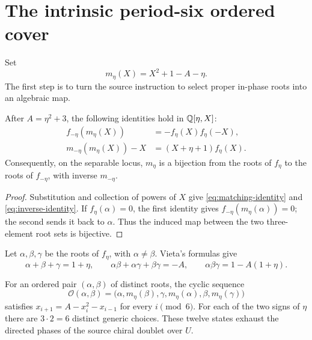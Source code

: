 \section{The intrinsic period-six ordered cover}\label{sec:ordered}

Set
\begin{equation}\label{eq:matching-map}
 m_\eta(X)=X^2+1-A-\eta.
\end{equation}
The first step is to turn the source instruction to select proper in-phase
roots into an algebraic map.

\begin{lemma}\label{lem:matching}
After $A=\eta^2+3$, the following identities hold in $\mathbb Q[\eta,X]$:
\begin{align}
 f_{-\eta}(m_\eta(X))&=-f_\eta(X)f_\eta(-X),
 \label{eq:matching-identity}\\
 m_{-\eta}(m_\eta(X))-X&=(X+\eta+1)f_\eta(X).
 \label{eq:inverse-identity}
\end{align}
Consequently, on the separable locus, $m_\eta$ is a bijection from the roots
of $f_\eta$ to the roots of $f_{-\eta}$, with inverse $m_{-\eta}$.
\end{lemma}

\begin{proof}
Substitution and collection of powers of $X$ give
\eqref{eq:matching-identity} and \eqref{eq:inverse-identity}.  If
$f_\eta(\alpha)=0$, the first identity gives
$f_{-\eta}(m_\eta(\alpha))=0$; the second sends it back to $\alpha$.
Thus the induced map between the two three-element root sets is bijective.
\end{proof}

Let $\alpha,\beta,\gamma$ be the roots of $f_\eta$, with
$\alpha\ne\beta$.  Vieta's formulas give
\begin{equation}\label{eq:vieta}
 \alpha+\beta+\gamma=1+\eta,\qquad
 \alpha\beta+\alpha\gamma+\beta\gamma=-A,\qquad
 \alpha\beta\gamma=1-A(1+\eta).
\end{equation}

\begin{proposition}\label{prop:twelve-states}
For an ordered pair $(\alpha,\beta)$ of distinct roots, the cyclic sequence
\begin{equation}\label{eq:orbit-sequence}
 \mathcal O(\alpha,\beta)=
 \bigl(\alpha,m_\eta(\beta),\gamma,m_\eta(\alpha),
       \beta,m_\eta(\gamma)\bigr)
\end{equation}
satisfies $x_{i+1}=A-x_i^2-x_{i-1}$ for every $i\pmod6$.
For each of the two signs of $\eta$ there are $3\cdot2=6$ distinct generic
choices.  These twelve states exhaust the directed phases of the source
chiral doublet over $U$.
\end{proposition}


